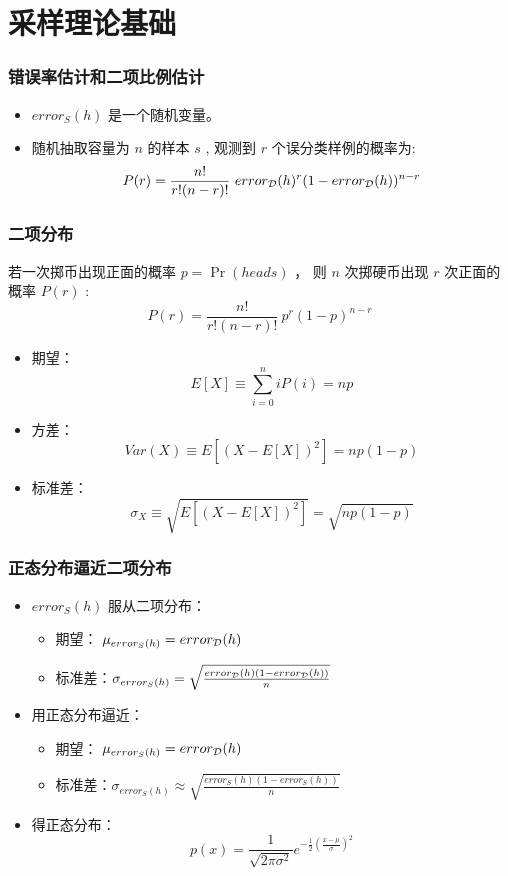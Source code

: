 \documentclass{beamer}
\begin{document}
\section{采样理论基础}
\label{sec-3}
\begin{frame}
\frametitle{错误率估计和二项比例估计}
\label{sec-3-1}

\begin{itemize}
\item $error_{S}(h)$ 是一个随机变量。
\item 随机抽取容量为 $n$ 的样本 $s$ , 观测到 $r$ 个误分类样例的概率为:
  $$P(r)  = \frac{n!}{r!(n-r)!}\ error_{\cal{D}}(h)^{r}(1-error_{\cal{D}}(h))^{n-r}$$
\end{itemize}
\end{frame}
\begin{frame}
\frametitle{二项分布}
\label{sec-3-2}


若一次掷币出现正面的概率 $p = \Pr(heads)$ ， 则 $n$ 次掷硬币出现 $r$ 次正面的概率 $P(r)$ :
$$P(r)  = \frac{n!}{r!(n-r)!}\ p^{r} (1- p)^{n-r}$$

\begin{itemize}
\item 期望： 
   $$E[X] \equiv  \sum_{i=0}^{n} i P(i) = np$$
\item 方差：
   $$Var(X) \equiv E[(X - E[X])^{2}] = np(1-p)$$
\item 标准差：
   $$\sigma_{X} \equiv  \sqrt{E[(X - E[X])^{2}]} = \sqrt{np(1-p)}$$
\end{itemize}
\end{frame}
\begin{frame}
\frametitle{正态分布逼近二项分布}
\label{sec-3-3}


\begin{itemize}
\item $error_{S}(h)$ 服从二项分布：
\begin{itemize}
\item 期望： $\mu_{error_{S}(h)} = error_{\cal{D}}(h)$
\item 标准差：$\sigma_{error_{S}(h)}  = \sqrt{\frac{error_{\cal{D}}(h)(1 - error_{\cal{D}}(h))}{n}}$
\end{itemize}
\item 用正态分布逼近：
\begin{itemize}
\item 期望： $\mu_{error_{S}(h)} = error_{\cal{D}}(h)$
\item 标准差：$\sigma_{error_{S}(h)} \approx \sqrt{\frac{error_{S}(h)(1 - error_{S}(h))}{n}}$
\end{itemize}
\item 得正态分布：
  $$p(x) = \frac{1}{\sqrt{2 \pi \sigma^{2}}} e^{-\frac{1}{2}(\frac{x -\mu}{\sigma})^{2}}$$
\end{itemize}
\end{frame}
\end{document}
